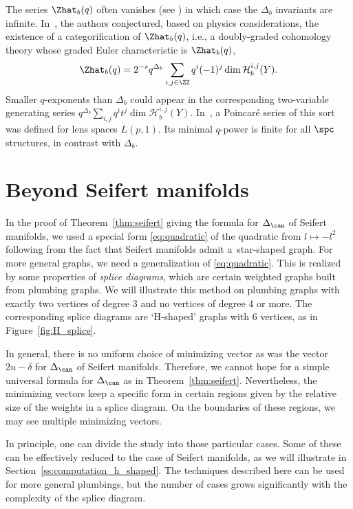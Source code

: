 \documentclass[10pt,a4paper]{amsart}
\begin{document}
\begin{Remark}
 The series $\Zhat_b(q)$ often vanishes (see \cite[Corollary~3.7]{GKS23})
 in which case the $\Delta_b$ invariants are infinite. In~\cite{GPPV20}, the authors conjectured, based on physics considerations, the existence of a categorification of $\Zhat_b(q)$, i.e., a doubly-graded cohomology theory  whose graded Euler characteristic is $\Zhat_b(q)$,
 \[
 \Zhat_b(q) = 2^{-s} q^{\Delta_b} \sum_{i, j \in \ZZ} q^i (-1)^j \dim \mathcal{H}_b^{i,j}(Y).
 \]
 Smaller $q$-exponents than $\Delta_b$ could appear in the corresponding two-variable generating series $q^{\Delta_b}\sum_{i,j} q^i t^j \dim \mathcal{H}_b^{i,j}(Y)$. In~\cite{GPV16}, a Poincar\'e series of this sort was defined for lens spaces $L(p,1)$. Its minimal $q$-power is finite for all $\spc$ structures, in contrast with $\Delta_b$.
\end{Remark}


\section{Beyond Seifert manifolds}\label{s:H_shaped}

In the proof of Theorem~\ref{thm:seifert} giving the formula for $\Delta_{\can}$ of Seifert manifolds, we used a special form \eqref{eq:quadratic} of the quadratic from $l \mapsto -l^2$ following from the fact that Seifert manifolds admit a~star-shaped graph. For more general graphs, we need a generalization of \eqref{eq:quadratic}. This is realized by some properties of \emph{splice diagrams}, which are certain weighted graphs built from plumbing graphs. We will illustrate this method on plumbing graphs with exactly two vertices of degree 3 and no vertices of degree 4 or more. The corresponding splice diagrams are `H-shaped' graphs with 6 vertices, as in Figure~\ref{fig:H_splice}.

In general, there is no uniform choice of minimizing vector as was the vector $2u-\delta$ for $\Delta_{\can}$ of Seifert manifolds. Therefore, we cannot hope for a simple universal formula for $\Delta_{\can}$ as in Theorem~\ref{thm:seifert}. Nevertheless, the minimizing vectors keep a specific form in certain regions given by the relative size of the weights in a splice diagram. On the boundaries of these regions, we may see multiple minimizing vectors.

In principle, one can divide the study into those particular cases. Some of these can be effectively reduced to the case of Seifert manifolds, as we will illustrate in Section~\ref{ss:computation_h_shaped}. The techniques described here can be used for more general plumbings, but the number of cases grows significantly with the complexity of the splice diagram.
\end{document}
